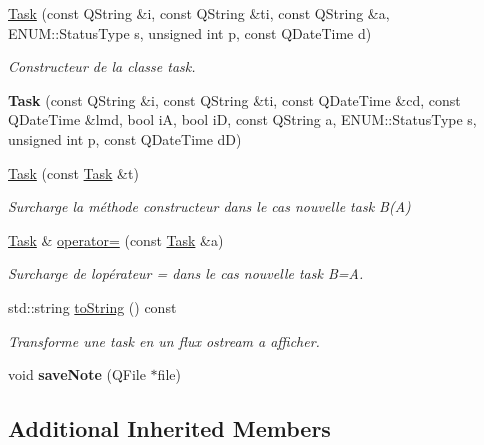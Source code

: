 \begin{DoxyCompactItemize}
\item 
\hyperlink{class_task_a08a0f57803d8ef35f687f23f759e9f0c}{Task} (const Q\+String \&i, const Q\+String \&ti, const Q\+String \&a, E\+N\+U\+M\+::\+Status\+Type s, unsigned int p, const Q\+Date\+Time d)
\begin{DoxyCompactList}\small\item\em Constructeur de la classe task. \end{DoxyCompactList}\item 
\mbox{\label{class_task_a5e397a4f57e750bd8624debc2dba5f4a}} 
{\bfseries Task} (const Q\+String \&i, const Q\+String \&ti, const Q\+Date\+Time \&cd, const Q\+Date\+Time \&lmd, bool iA, bool iD, const Q\+String a, E\+N\+U\+M\+::\+Status\+Type s, unsigned int p, const Q\+Date\+Time dD)
\item 
\mbox{\label{class_task_a0aec5018915f11c96398b75f969a3220}} 
\hyperlink{class_task_a0aec5018915f11c96398b75f969a3220}{Task} (const \hyperlink{class_task}{Task} \&t)
\begin{DoxyCompactList}\small\item\em Surcharge la méthode constructeur dans le cas nouvelle task B(\+A) \end{DoxyCompactList}\item 
\mbox{\label{class_task_a2430b942d050bf32c771821daa31493f}} 
\hyperlink{class_task}{Task} \& \hyperlink{class_task_a2430b942d050bf32c771821daa31493f}{operator=} (const \hyperlink{class_task}{Task} \&a)
\begin{DoxyCompactList}\small\item\em Surcharge de l\textquotesingle{}opérateur = dans le cas nouvelle task B=A. \end{DoxyCompactList}\item 
std\+::string \hyperlink{class_task_a7fe5cb7b57a21693e7abfea2f9618563}{to\+String} () const
\begin{DoxyCompactList}\small\item\em Transforme une task en un flux ostream a afficher. \end{DoxyCompactList}\item 
\mbox{\label{class_task_a313eb342d047e8e5cab91bf51609a2f3}} 
void {\bfseries save\+Note} (Q\+File $\ast$file)
\end{DoxyCompactItemize}
\subsection*{Additional Inherited Members}


